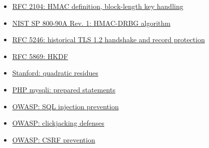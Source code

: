 \documentclass[11pt,a4paper]{article}
\begin{document}
\begin{itemize}

\item \href{https://www.rfc-editor.org/rfc/rfc2104}{RFC 2104: HMAC definition,\allowbreak{} block-length key handling}

\item \href{https://nvlpubs.nist.gov/nistpubs/SpecialPublications/NIST.SP.800-90Ar1.pdf}{NIST SP 800-90A Rev. 1: HMAC-DRBG algorithm}

\item \href{https://www.rfc-editor.org/rfc/rfc5246}{RFC 5246: historical TLS 1.2 handshake and record protection}

\item \href{https://www.rfc-editor.org/rfc/rfc5869}{RFC 5869: HKDF}

\item \href{https://crypto.stanford.edu/pbc/notes/numbertheory/qr.html}{Stanford: quadratic residues}

\item \href{https://www.php.net/manual/en/mysqli.quickstart.prepared-statements.php}{PHP mysqli: prepared statements}

\item \href{https://cheatsheetseries.owasp.org/cheatsheets/SQL_Injection_Prevention_Cheat_Sheet.html}{OWASP: SQL injection prevention}

\item \href{https://cheatsheetseries.owasp.org/cheatsheets/Clickjacking_Defense_Cheat_Sheet.html}{OWASP: clickjacking defenses}

\item \href{https://cheatsheetseries.owasp.org/cheatsheets/Cross-Site_Request_Forgery_Prevention_Cheat_Sheet.html}{OWASP: CSRF prevention}

\end{itemize}
\end{document}
